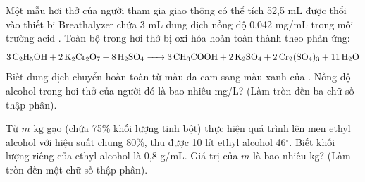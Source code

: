 \documentclass[12pt,a4paper]{article}
\begin{document}
\begin{ex}
Một mẫu hơi thở của người tham gia giao thông có thể tích 52,5 mL được thổi vào thiết bị Breathalyzer chứa 3 mL dung dịch  nồng độ 0,042 mg/mL trong môi trường acid . Toàn bộ  trong hơi thở bị oxi hóa hoàn toàn thành  theo phản ứng:
\[
\ce{3C2H5OH + 2K2Cr2O7 + 8H2SO4 -> 3CH3COOH + 2K2SO4 + 2Cr2(SO4)3 + 11H2O}
\]
Biết dung dịch chuyển hoàn toàn từ màu da cam sang màu xanh của . Nồng độ alcohol trong hơi thở của người đó là bao nhiêu mg/L? (Làm tròn đến ba chữ số thập phân).
\end{ex}

\begin{ex}
Từ $m\text{ kg}$ gạo (chứa 75\% khối lượng tinh bột) thực hiện quá trình lên men ethyl alcohol với hiệu suất chung 80\%, thu được 10 lít ethyl alcohol 46$^\circ$. Biết khối lượng riêng của ethyl alcohol là 0,8 g/mL. Giá trị của $m$ là bao nhiêu kg? (Làm tròn đến một chữ số thập phân).
\end{ex}
\end{document}
